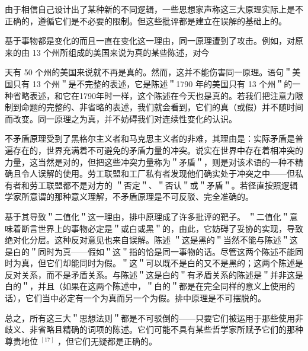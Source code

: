 由于相信自己设计出了某种新的不同逻辑，一些思想家声称这三大原理实际上是不正确的，遵循它们是不必要的限制。但这些批评都是建立在误解的基础上的。

基于事物都是变化的而且一直在变化这一理由，同一原理遭到了攻击。例如，对原来的由 13 个州所组成的美国来说为真的某些陈述，对今

天有 50 个州的美国来说就不再是真的。然而，这并不能伤害同一原理。语句＂美国只有 13 个州＂是不完整的表述，它是陈述＂1790 年的美国只有 13 个州＂的一种省略表述，和它在1790年时一样，这个陈述在今天也是真的。若我们把注意力限制到命题的完整的、非省略的表述，我们就会看到，它们的真（或假）并不随时间而改变。同一原理之为真，并不妨碍我们对连续性变化的认识。

不矛盾原理受到了黑格尔主义者和马克思主义者的非难，其理由是：实际矛盾是普遍存在的，世界充满着不可避免的矛盾力量的冲突。说实在世界中存在着相冲突的力量，这当然是对的，但把这些冲突力量称为＂矛盾＂，则是对该术语的一种不精确且令人误解的使用。劳工联盟和工厂私有者发现他们确实处于冲突之中——但私有者和劳工联盟都不是对方的 ＂否定＂、＂否认＂或＂矛盾＂。若径直按照逻辑学家所意谓的那种意义理解，不矛盾原理是不可反驳、完全准确的。

基于其导致＂二值化＂这一理由，排中原理成了许多批评的靶子。 ＂二值化＂意味着断言世界上的事物必定是＂或白或黑＂的，由此，它妨碍了妥协的实现，导致绝对化分层。这种反对意见也来自误解。陈述 ＂这是黑的＂当然不能与陈述＂这是白的＂同时为真——假如＂这＂指的恰是同一事物的话。尽管这两个陈述不能同时为真，但它们却能同时为假。＂这＂可以既不是白的又不是黑的；这两个陈述是反对关系，而不是矛盾关系。与陈述＂这是白的＂有矛盾关系的陈述是＂并非这是白的＂，并且（如果在这两个陈述中，＂白的＂都是在完全同样的意义上使用的话），它们当中必定有一个为真而另一个为假。排中原理是不可摆脱的。

总之，所有这三大＂思想法则＂都是不可驳倒的——只要它们被运用于那些使用非歧义、非省略且精确的词项的陈述。它们可能不具有某些哲学家所赋予它们的那种尊贵地位 ${ }^{[17]}$ ，但它们无疑都是正确的。

